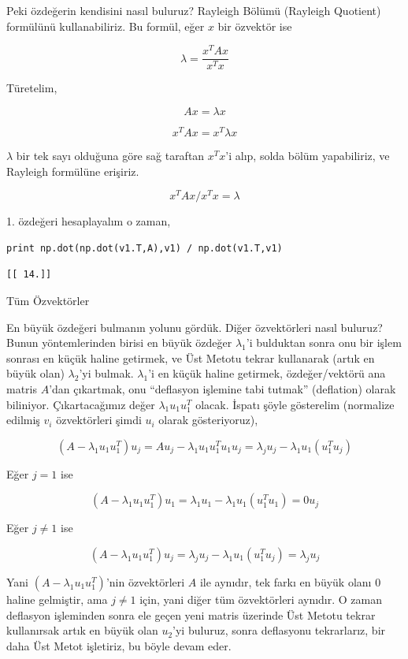 \documentclass[12pt,fleqn]{article}\usepackage{../../common}
\begin{document}
Peki özdeğerin kendisini nasıl buluruz? Rayleigh Bölümü (Rayleigh Quotient) 
formülünü kullanabiliriz. Bu formül, eğer $x$ bir özvektör ise

$$ \lambda = \frac{x^TAx}{x^Tx} $$

Türetelim,

$$ Ax = \lambda x  $$

$$ x^TAx = x^T\lambda x $$

$\lambda$ bir tek sayı olduğuna göre sağ taraftan $x^Tx$'i alıp, solda bölüm
yapabiliriz, ve Rayleigh formülüne erişiriz.

$$ x^TAx / x^Tx = \lambda $$

1. özdeğeri hesaplayalım o zaman,

\begin{verbatim}
print np.dot(np.dot(v1.T,A),v1) / np.dot(v1.T,v1)
\end{verbatim}

\begin{verbatim}
[[ 14.]]
\end{verbatim}

Tüm Özvektörler

En büyük özdeğeri bulmanın yolunu gördük. Diğer özvektörleri nasıl buluruz?
Bunun yöntemlerinden birisi en büyük özdeğer $\lambda_1$'i bulduktan sonra
onu bir işlem sonrası en küçük haline getirmek, ve Üst Metotu tekrar
kullanarak (artık en büyük olan) $\lambda_2$'yi bulmak. $\lambda_1$'i en
küçük haline getirmek, özdeğer/vektörü ana matris $A$'dan çıkartmak, onu
``deflasyon işlemine tabi tutmak'' (deflation) olarak
biliniyor. Çıkartacağımız değer  $\lambda_1u_1u_1^T$ olacak. İspatı
şöyle gösterelim (normalize edilmiş $v_i$ özvektörleri şimdi $u_i$ olarak
gösteriyoruz), 

$$ (A-\lambda_1u_1u_1^T)u_j = Au_j-\lambda_1u_1u_1^Tu_1u_j = 
\lambda_ju_j - \lambda_1u_1(u_1^Tu_j)
$$

Eğer $j=1$ ise

$$  (A-\lambda_1u_1u_1^T)u_1 = \lambda_1u_1 - \lambda_1u_1(u_1^Tu_1) = 0u_j$$

Eğer $j \ne 1$ ise

$$ (A-\lambda_1u_1u_1^T)u_j = \lambda_ju_j - \lambda_1u_1(u_1^Tu_j) = \lambda_ju_j  $$

Yani $(A-\lambda_1u_1u_1^T)$'nin özvektörleri $A$ ile aynıdır, tek farkı en
büyük olanı 0 haline gelmiştir, ama $j \ne 1$ için, yani diğer tüm
özvektörleri aynıdır. O zaman deflasyon işleminden sonra ele geçen yeni
matris üzerinde Üst Metotu tekrar kullanırsak artık en büyük olan $u_2$'yi
buluruz, sonra deflasyonu tekrarlarız, bir daha Üst Metot işletiriz, bu
böyle devam eder. 
\end{document}
